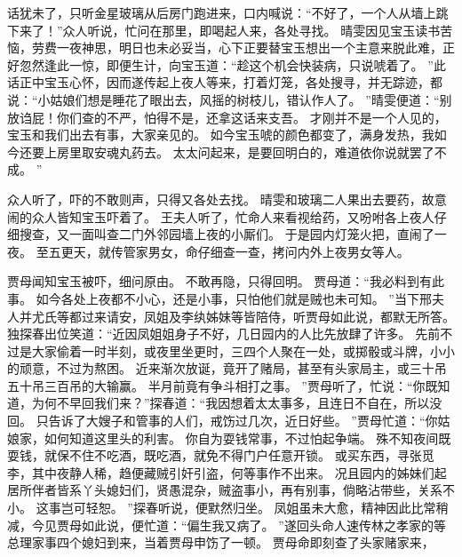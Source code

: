 话犹未了，只听金星玻璃从后房门跑进来，口内喊说：“不好了，一个人从墙上跳下来了！”众人听说，忙问在那里，即喝起人来，各处寻找。
晴雯因见宝玉读书苦恼，劳费一夜神思，明日也未必妥当，心下正要替宝玉想出一个主意来脱此难，正好忽然逢此一惊，即便生计，向宝玉道：“趁这个机会快装病，只说唬着了。
”此话正中宝玉心怀，因而遂传起上夜人等来，打着灯笼，各处搜寻，并无踪迹，都说：“小姑娘们想是睡花了眼出去，风摇的树枝儿，错认作人了。
”晴雯便道：“别放诌屁！你们查的不严，怕得不是，还拿这话来支吾。
才刚并不是一个人见的，宝玉和我们出去有事，大家亲见的。
如今宝玉唬的颜色都变了，满身发热，我如今还要上房里取安魂丸药去。
太太问起来，是要回明白的，难道依你说就罢了不成。
”\par
众人听了，吓的不敢则声，只得又各处去找。
晴雯和玻璃二人果出去要药，故意闹的众人皆知宝玉吓着了。
王夫人听了，忙命人来看视给药，又吩咐各上夜人仔细搜查，又一面叫查二门外邻园墙上夜的小厮们。
于是园内灯笼火把，直闹了一夜。
至五更天，就传管家男女，命仔细查一查，拷问内外上夜男女等人。
\par
贾母闻知宝玉被吓，细问原由。
不敢再隐，只得回明。
贾母道：“我必料到有此事。
如今各处上夜都不小心，还是小事，只怕他们就是贼也未可知。
”当下邢夫人并尤氏等都过来请安，凤姐及李纨姊妹等皆陪侍，听贾母如此说，都默无所答。
独探春出位笑道：“近因凤姐姐身子不好，几日园内的人比先放肆了许多。
先前不过是大家偷着一时半刻，或夜里坐更时，三四个人聚在一处，或掷骰或斗牌，小小的顽意，不过为熬困。
近来渐次放诞，竟开了赌局，甚至有头家局主，或三十吊五十吊三百吊的大输赢。
半月前竟有争斗相打之事。
”贾母听了，忙说：“你既知道，为何不早回我们来？”探春道：“我因想着太太事多，且连日不自在，所以没回。
只告诉了大嫂子和管事的人们，戒饬过几次，近日好些。
”贾母忙道：“你姑娘家，如何知道这里头的利害。
你自为耍钱常事，不过怕起争端。
殊不知夜间既耍钱，就保不住不吃酒，既吃酒，就免不得门户任意开锁。
或买东西，寻张觅李，其中夜静人稀，趋便藏贼引奸引盗，何等事作不出来。
况且园内的姊妹们起居所伴者皆系丫头媳妇们，贤愚混杂，贼盗事小，再有别事，倘略沾带些，关系不小。
这事岂可轻恕。
”探春听说，便默然归坐。
凤姐虽未大愈，精神因此比常稍减，今见贾母如此说，便忙道：“偏生我又病了。
”遂回头命人速传林之孝家的等总理家事四个媳妇到来，当着贾母申饬了一顿。
贾母命即刻查了头家赌家来，
